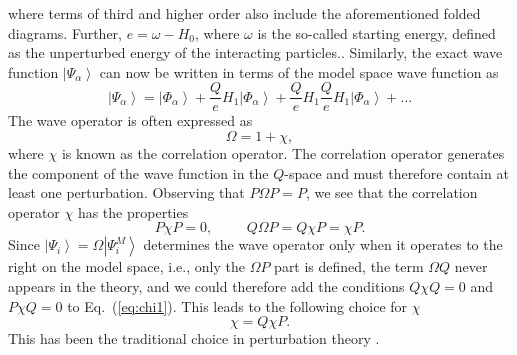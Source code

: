 \documentclass{article}
\begin{document}
where terms of third and higher order also
include the aforementioned folded diagrams.
Further, $e=\omega -H_0$,
where $\omega$ is the so-called starting energy, defined as the unperturbed
energy of the interacting particles..
Similarly,
the exact wave
function $\left|\Psi_{\alpha}\right\rangle$
can now be written in terms of the model space wave function as
\begin{equation}
                \left|\Psi_{\alpha}\right\rangle=
                \left|\Phi_{\alpha}\right\rangle+
                \frac{Q}{e}H_1\left|\Phi_{\alpha}\right\rangle
                +\frac{Q}{e}H_1\frac{Q}{e}H_1\left|\Phi_{\alpha}\right\rangle
                +\dots
                \label{eq:wavef}
\end{equation}
The wave operator is often expressed as
\begin{equation}
              \Omega = 1 +\chi,
\end{equation}
where $\chi$ is known as the correlation operator. The correlation
operator generates the component of the wave function in the $Q$-space
and must therefore contain at least one perturbation. Observing
that $P\Omega P = P$, we see that the correlation operator $\chi$
has the properties
\begin{equation}
               P\chi P = 0, \hspace{1cm} Q\Omega P =
              Q\chi P =\chi P. \label{eq:chi1}
\end{equation}
Since  $\left|\Psi_i\right\rangle=\Omega\left|\Psi_i^{M}\right\rangle$
determines the wave operator
only when it operates to the right on the model space, i.e., only the
$\Omega P$  part is defined, the term $\Omega Q$
never appears in the theory,
and we could therefore add the conditions $Q\chi Q =0$ and $P\chi Q =0$
to Eq.\ (\ref{eq:chi1}). This leads to the following choice for $\chi$
\begin{equation}
                   \chi = Q\chi P. \label{eq:chi2}
\end{equation}
This has been the traditional choice in perturbation theory \cite{so95,lm85}.
\end{document}
